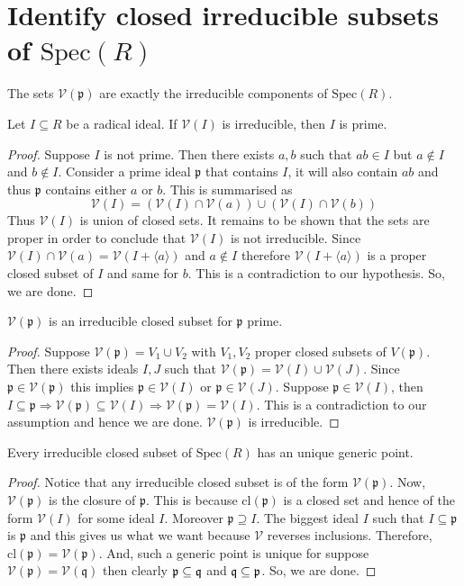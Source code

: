 \documentclass[oneside, 12pt, ]{scrbook}
\newcommand{\V}{\mathcal{V}}
\newcommand{\spec}{\mathrm{Spec}}
\newcommand{\pr}{\mathfrak{p}}
\theoremstyle{theorem}
\begin{document}
\section{Identify closed irreducible subsets of $\spec(R)$}

\begin{proposition}
The sets $\V(\pr)$ are exactly the irreducible components of $\spec(R)$.
\end{proposition}

\begin{lemma}
Let $I \subseteq R$ be a radical ideal. If $\V(I)$ is irreducible, then $I$ is prime.  
\end{lemma}

\begin{proof}
Suppose $I$ is not prime. Then there exists $a,b$ such that $ab \in I$ but $a\not \in I$ and $b \not \in I$. Consider a prime ideal $\pr$ that contains $I$, it will also contain $ab$ and thus $\pr$ contains either $a$ or $b$. This is summarised as $$\V(I) = (\V(I)\cap \V(a)) \cup (\V(I) \cap \V(b))$$ Thus $\V(I)$ is union of closed sets. It remains to be shown that the sets are proper in order to conclude that $\V(I)$ is not irreducible. Since $\V(I) \cap \V(a) = \V(I + \langle a \rangle)$ and $a \not \in I$ therefore $\V(I +\langle a \rangle)$ is a proper closed subset of $I$ and same for $b$. This is a contradiction to our hypothesis. So, we are done. 
\end{proof}

\begin{lemma}
$\V(\pr)$ is an irreducible closed subset for $\pr$ prime.
\end{lemma}

\begin{proof}
Suppose $\V(\pr) = V_{1} \cup V_{2}$ with $V_{1},V_{2}$ proper closed subsets of $V(\pr)$. Then there exists ideals $I,J$ such that $\V(\pr) = \V(I) \cup \V(J)$. Since $\pr \in \V(\pr)$ this implies $\pr \in \V(I)$ or $\pr \in \V(J)$. Suppose $\pr \in \V(I)$, then $I \subseteq \pr \Rightarrow \V(\pr) \subseteq \V(I) \Rightarrow \V(\pr) = \V(I)$. This is a contradiction to our assumption and hence we are done. $\V(\pr)$ is irreducible.
\end{proof}

\begin{proposition}
Every irreducible closed subset of $\spec(R)$ has an unique generic point.
\end{proposition}

\begin{proof}
Notice that any irreducible closed subset is of the form $\V(\pr)$. Now, $\V(\pr)$ is the closure of $\pr$. This is because $\mathrm{cl}(\pr)$ is a closed set and hence of the form $\V(I)$ for some ideal $I$. Moreover $\pr \supseteq I$. The biggest ideal $I$ such that $I \subseteq \pr$ is $\pr$ and this gives us what we want because $\V$ reverses inclusions. Therefore, $\mathrm{cl}(\pr) = \V(\pr)$. And, such a generic point is unique for suppose $\V(\pr) = \V(\mathfrak{q})$ then clearly $\pr \subseteq \frak{q}$ and $\frak{q} \subseteq \pr$. So, we are done. 
\end{proof}
\end{document}
